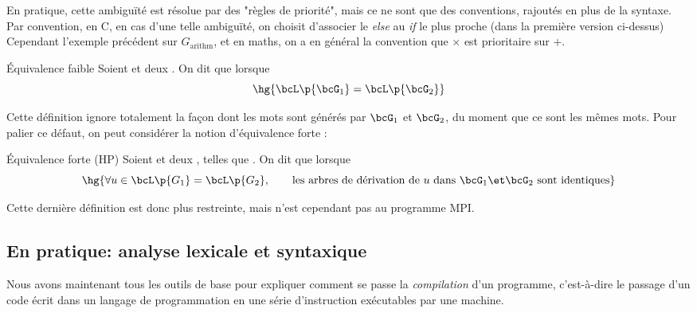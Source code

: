     En pratique, cette ambiguïté est résolue par des "règles de priorité", mais ce ne sont que des conventions, rajoutés en plus de la syntaxe.
    Par convention, en C, en cas d'une telle ambiguïté, on choisit d'associer le \emph{else} au \emph{if} le plus proche (dans la première version ci-dessus)
    Cependant l'exemple précédent sur $G_\text{arithm}$, et en maths, on a en général la convention que $\times$ est prioritaire sur $+$.
    
    \begin{definition}{Équivalence faible}{}
        Soient  et  deux . On dit que  lorsque
        \[ \hg{\bcL\p{\bcG_1} = \bcL\p{\bcG_2}}\]
    \end{definition}
    
    Cette définition ignore totalement la façon dont les mots sont générés par $\bcG_1$ et $\bcG_2$, du moment que ce sont les mêmes mots. Pour palier ce défaut, on peut considérer la notion d'équivalence forte :
    
    \begin{definition}{Équivalence forte (HP)}{}
        Soient  et  deux , telles que . On dit que  lorsque
        \[ \hg{\forall u \in \bcL\p{G_1} = \bcL\p{G_2},\qquad \text{les arbres de dérivation de} \ u \ \text{dans} \ \bcG_1 \et \bcG_2 \ \text{sont identiques}}\]
    \end{definition}
    
    Cette dernière définition est donc plus restreinte, mais n'est cependant pas au programme MPI.
    
    \subsection{En pratique: analyse lexicale et syntaxique}
    
    Nous avons maintenant tous les outils de base pour expliquer comment se passe la \emph{compilation} d'un programme, c'est-à-dire le passage d'un code écrit dans un langage de programmation en une série d'instruction exécutables par une machine. 
    

